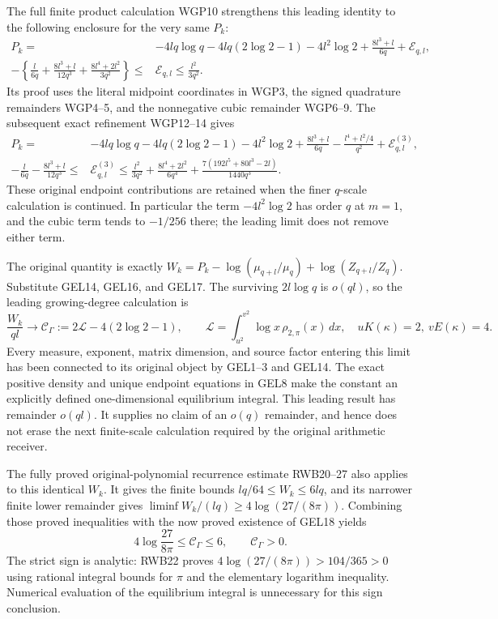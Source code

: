\documentclass[11pt,a4paper]{article}
\begin{document}
The full finite product calculation WGP10 strengthens this leading
identity to the following enclosure for the very same \(P_k\):
\[
 \begin{split}
 P_k={}&-4lq\log q-4lq(2\log2-1)-4l^2\log2
              +\frac{8l^3+l}{6q}+\mathcal E_{q,l},\\
 -\left\{\frac l{6q}+\frac{8l^3+l}{12q^3}
                 +\frac{8l^4+2l^2}{3q^2}\right\}
 \leq{}&\mathcal E_{q,l}\leq\frac{l^2}{3q^2}.
 \end{split}
 \tag{GEL17a}
\]
Its proof uses the literal midpoint coordinates in WGP3, the signed
quadrature remainders WGP4--5, and the nonnegative cubic remainder
WGP6--9. The subsequent exact refinement WGP12--14 gives
\[
 \begin{split}
 P_k={}&-4lq\log q-4lq(2\log2-1)-4l^2\log2
 +\frac{8l^3+l}{6q}-\frac{l^4+l^2/4}{q^2}
          +\mathcal E^{(3)}_{q,l},\\
 -\frac l{6q}-\frac{8l^3+l}{12q^3}
 \leq{}&\mathcal E^{(3)}_{q,l}\leq
 \frac{l^2}{3q^2}+\frac{8l^4+2l^2}{6q^4}
                 +\frac{7(192l^5+80l^3-2l)}{1440q^3}.
 \end{split}
 \tag{GEL17b}
\]
These original endpoint contributions are retained when the finer
\(q\)-scale calculation is continued. In particular the term
\(-4l^2\log2\) has order \(q\) at \(m=1\), and the cubic term tends
to \(-1/256\) there; the leading limit does not remove either term.

The original quantity is exactly
\(W_k=P_k-\log(\mu_{q+l}/\mu_q)+\log(Z_{q+l}/Z_q)\).
Substitute GEL14, GEL16, and GEL17. The surviving
\(2l\log q\) is \(o(ql)\), so the leading growing-degree calculation is
\[
 \boxed{\frac{W_k}{ql}\longrightarrow
 \mathcal C_\Gamma:=2\mathcal L-4(2\log2-1),\qquad
 \mathcal L=\int_{u^2}^{v^2}\log x\,\rho_{2,\pi}(x)\,dx,\quad
 uK(\kappa)=2,\ vE(\kappa)=4.}
 \tag{GEL18}
\]
Every measure, exponent, matrix dimension, and source factor entering this
limit has been connected to its original object by GEL1--3 and GEL14.
The exact positive density and unique endpoint equations in GEL8 make
the constant an explicitly defined one-dimensional equilibrium integral.
This leading result has remainder \(o(ql)\). It supplies no claim of
an \(o(q)\) remainder, and hence does not erase the next finite-scale
calculation required by the original arithmetic receiver.

The fully proved original-polynomial recurrence estimate RWB20--27
also applies to this identical \(W_k\). It gives the finite bounds
\(lq/64\leq W_k\leq6lq\), and its narrower finite lower remainder
gives \(\liminf W_k/(lq)\geq4\log(27/(8\pi))\). Combining those
proved inequalities with the now proved existence of GEL18 yields
\[
 \boxed{4\log\frac{27}{8\pi}\leq\mathcal C_\Gamma\leq6,
              \qquad\mathcal C_\Gamma>0.}
 \tag{GEL18a}
\]
The strict sign is analytic: RWB22 proves
\(4\log(27/(8\pi))>104/365>0\) using rational integral bounds for
\(\pi\) and the elementary logarithm inequality. Numerical evaluation
of the equilibrium integral is unnecessary for this sign conclusion.
\end{document}
